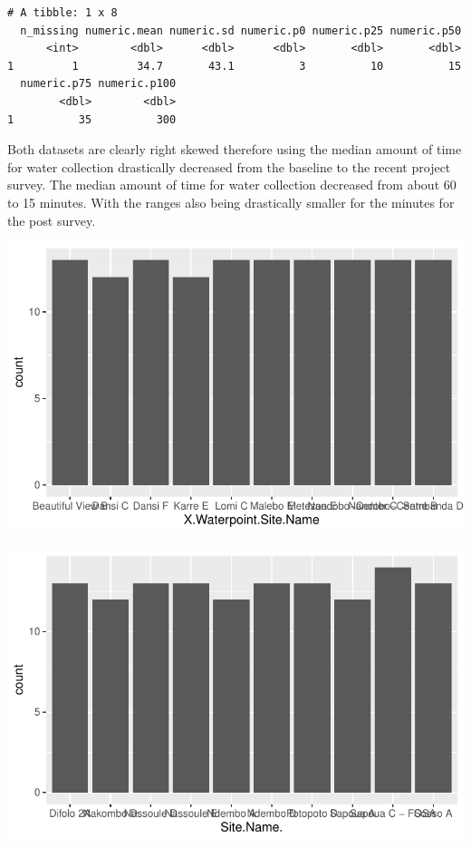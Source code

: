 \documentclass[
  letterpaper,
  DIV=11,
  numbers=noendperiod]{scrartcl}
\begin{document}
\begin{verbatim}
# A tibble: 1 x 8
  n_missing numeric.mean numeric.sd numeric.p0 numeric.p25 numeric.p50
      <int>        <dbl>      <dbl>      <dbl>       <dbl>       <dbl>
1         1         34.7       43.1          3          10          15
  numeric.p75 numeric.p100
        <dbl>        <dbl>
1          35          300
\end{verbatim}

Both datasets are clearly right skewed therefore using the median amount
of time for water collection drastically decreased from the baseline to
the recent project survey. The median amount of time for water
collection decreased from about 60 to 15 minutes. With the ranges also
being drastically smaller for the minutes for the post survey.

\includegraphics{report_files/figure-pdf/unnamed-chunk-7-1.pdf}

\includegraphics{report_files/figure-pdf/unnamed-chunk-8-1.pdf}
\end{document}
